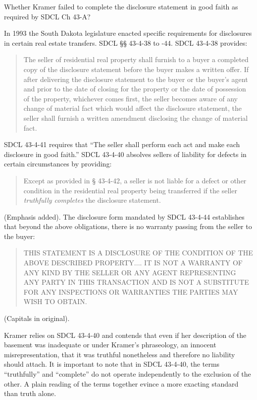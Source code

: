
Whether Kramer failed to complete the disclosure statement in good faith as
required by SDCL Ch 43-A?

In 1993 the South Dakota legislature enacted specific requirements for
disclosures in certain real estate transfers. SDCL {\S}{\S} 43-4-38 to -44.
SDCL 43-4-38 provides:
\begin{quote}
The seller of residential real property shall furnish to a buyer a completed
copy of the disclosure statement before the buyer makes a written offer. If
after delivering the disclosure statement to the buyer or the buyer's agent and
prior to the date of closing for the property or the date of possession of the
property, whichever comes first, the seller becomes aware of any change of
material fact which would affect the disclosure statement, the seller shall
furnish a written amendment disclosing the change of material fact.
\end{quote}

SDCL 43-4-41 requires that ``The seller shall perform each act and make each
disclosure in good faith.'' SDCL 43-4-40 absolves sellers of liability for
defects in certain circumstances by providing:
\begin{quote}
Except as provided in {\S} 43-4-42, a seller is not liable for a defect or other
condition in the residential real property being transferred if the seller
\textit{truthfully completes} the disclosure statement.
\end{quote}
(Emphasis added). The disclosure form mandated by SDCL 43-4-44 establishes that
beyond the above obligations, there is no warranty passing from the seller to
the buyer:
\begin{quote}
THIS STATEMENT IS A DISCLOSURE OF THE CONDITION OF THE ABOVE DESCRIBED
PROPERTY.... IT IS NOT A WARRANTY OF ANY KIND BY THE SELLER OR ANY AGENT
REPRESENTING ANY PARTY IN THIS TRANSACTION AND IS NOT A SUBSTITUTE FOR ANY
INSPECTIONS OR WARRANTIES THE PARTIES MAY WISH TO OBTAIN.
\end{quote}
(Capitals in original).

Kramer relies on SDCL 43-4-40 and contends that even if her description of the
basement was inadequate or under Kramer's phraseology, an innocent
misrepresentation, that it was truthful nonetheless and therefore no liability
should attach. It is important to note that in SDCL 43-4-40, the terms
``truthfully'' and ``complete'' do not operate independently to the exclusion
of the other. A plain reading of the terms together evince a more exacting
standard than truth alone.

